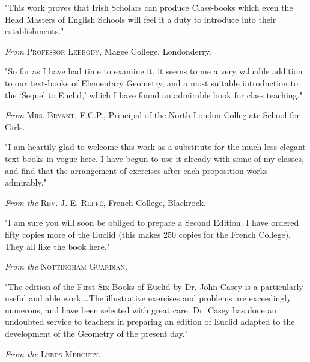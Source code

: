 \documentclass[oneside]{book}
\begin{document}
\begin{footnotesize}
"This work proves that Irish Scholars can produce Class-books
which even the Head Masters of English Schools will feel it a
duty to introduce into their establishments."

\medskip
\begin{center}
\textit{From} \textsc{Professor Leebody}, Magee College, Londonderry.
\end{center}
\nopagebreak

"So far as I have had time to examine it, it seems to me a
very valuable addition to our text-books of Elementary Geometry,
and a most suitable introduction to the `Sequel to Euclid,' which
I have found an admirable book for class teaching."

\medskip
\begin{center}
\textit{From} \textsc{Mrs. Bryant}, F.C.P., Principal of the North London Collegiate
School for Girls.
\end{center}
\nopagebreak

"I am heartily glad to welcome this work as a substitute for
the much less elegant text-books in vogue here. I have begun
to use it already with some of my classes, and find that the
arrangement of exercises after each proposition works admirably."

\medskip
\begin{center}
\textit{From the} \textsc{Rev. J. E. Reffé}, French College, Blackrock.
\end{center}
\nopagebreak

"I am sure you will soon be obliged to prepare a Second
Edition. I have ordered fifty copies more of the Euclid (this
makes 250 copies for the French College). They all like the book
here."

\medskip
\begin{center}
\textit{From the} \textsc{Nottingham Guardian}.
\end{center}
\nopagebreak

"The edition of the First Six Books of Euclid by Dr. John
Casey is a particularly useful and able work.\ldots The illustrative
exercises and problems are exceedingly numerous, and
have been selected with great care. Dr. Casey has done an
undoubted service to teachers in preparing an edition of Euclid
adapted to the development of the Geometry of the present day."

\medskip
\begin{center}
\textit{From the} \textsc{Leeds Mercury}.
\end{center}
\nopagebreak


\end{footnotesize}
\end{document}

